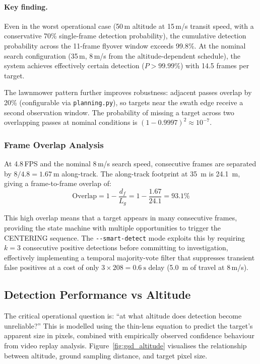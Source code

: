 \paragraph{Key finding.}
Even in the worst operational case (50\,m altitude at 15\,m/s transit speed, with a conservative 70\% single-frame detection probability), the cumulative detection probability across the 11-frame flyover window exceeds 99.8\%.  At the nominal search configuration (35\,m, 8\,m/s from the altitude-dependent schedule), the system achieves effectively certain detection ($P > 99.99\%$) with 14.5 frames per target.

The lawnmower pattern further improves robustness: adjacent passes overlap by 20\% (configurable via \texttt{planning.py}), so targets near the swath edge receive a second observation window.  The probability of missing a target across two overlapping passes at nominal conditions is $(1 - 0.9997)^2 \approx 10^{-7}$.

\subsubsection{Frame Overlap Analysis}

At 4.8\,FPS and the nominal 8\,m/s search speed, consecutive frames are separated by $8/4.8 = \SI{1.67}{\metre}$ along-track.  The along-track footprint at \SI{35}{\metre} is \SI{24.1}{\metre}, giving a frame-to-frame overlap of:
\begin{equation}
    \mathrm{Overlap} = 1 - \frac{d_f}{L_g} = 1 - \frac{1.67}{24.1} = 93.1\%
\end{equation}

This high overlap means that a target appears in many consecutive frames, providing the state machine with multiple opportunities to trigger the CENTERING sequence.  The \texttt{-{}-smart-detect} mode exploits this by requiring $k = 3$ consecutive positive detections before committing to investigation, effectively implementing a temporal majority-vote filter that suppresses transient false positives at a cost of only $3 \times 208 = \SI{0.6}{\second}$ delay (\SI{5.0}{\metre} of travel at 8\,m/s).

\subsection{Detection Performance vs Altitude}\label{app:cv:altitude}

The critical operational question is: ``at what altitude does detection become unreliable?''  This is modelled using the thin-lens equation to predict the target's apparent size in pixels, combined with empirically observed confidence behaviour from video replay analysis. Figure~\ref{fig:gsd_altitude} visualises the relationship between altitude, ground sampling distance, and target pixel size.


